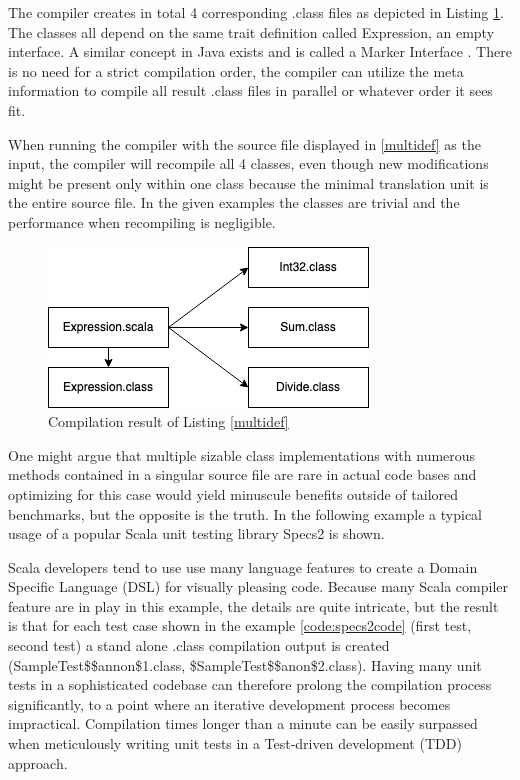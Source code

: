 \documentclass{VUMIFPSbakalaurinis}
\begin{document}
The compiler creates in total 4 corresponding .class files as depicted in Listing \ref{img:Expression}.
The classes all depend on the same trait definition called Expression, an empty interface.
A similar concept in Java exists and is called a Marker Interface \cite{10.5555/1407381}.
There is no need for a strict compilation order, the compiler can utilize the meta information to compile all result .class files in parallel or whatever order it sees fit.

When running the compiler with the source file displayed in \ref{multidef} as the input, the compiler will recompile all 4 classes, even though new modifications might be present only within one class because the minimal translation unit is the entire source file.
In the given examples the classes are trivial and the performance when recompiling is negligible.

\begin{figure}[H]
    \centering
    \includegraphics[scale=0.6]{img/Expression}
    \caption{Compilation result of Listing \ref{multidef}}
    \label{img:Expression}
\end{figure}

One might argue that multiple sizable class implementations with numerous methods contained in a singular source file are rare in actual code bases and optimizing for this case would yield minuscule benefits outside of tailored benchmarks, but the opposite is the truth. %
In the following example a typical usage of a popular Scala unit testing library Specs2 \cite{Specs2Github} is shown.



Scala developers tend to use use many language features to create a Domain Specific Language (DSL) for visually pleasing code.
Because many Scala compiler feature are in play in this example, the details are quite intricate, but the result is that for each test case shown in the example \ref{code:specs2code} (first test, second test) a stand alone .class compilation output is created (SampleTest\$\$annon\$1.class, \$SampleTest\$\$anon\$2.class).
Having many unit tests in a sophisticated codebase can therefore prolong the compilation process significantly, to a point where an iterative development process becomes impractical.
Compilation times longer than a minute can be easily surpassed when meticulously writing unit tests in a Test-driven development (TDD) approach.
\end{document}
